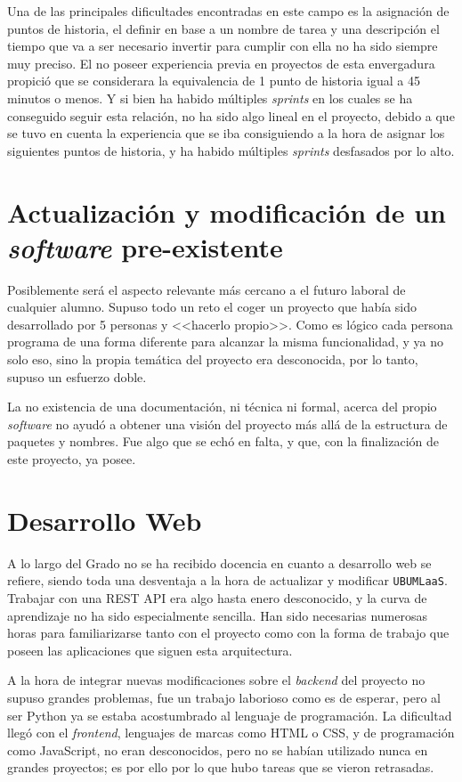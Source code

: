 Una de las principales dificultades encontradas en este campo es la asignación de puntos de historia, el definir en base a un nombre de tarea y una descripción el tiempo que va a ser necesario invertir para cumplir con ella no ha sido siempre muy preciso. El no poseer experiencia previa en proyectos de esta envergadura propició que se considerara la equivalencia de 1 punto de historia igual a 45 minutos o menos. Y si bien ha habido múltiples \textit{sprints} en los cuales se ha conseguido seguir esta relación, no ha sido algo lineal en el proyecto, debido a que se tuvo en cuenta la experiencia que se iba consiguiendo a la hora de asignar los siguientes puntos de historia, y ha habido múltiples \textit{sprints} desfasados por lo alto.

\section{Actualización y modificación de un \textit{software} pre-existente}
Posiblemente será el aspecto relevante más cercano a el futuro laboral de cualquier alumno. Supuso todo un reto el coger un proyecto que había sido desarrollado por 5 personas y <<hacerlo propio>>. Como es lógico cada persona programa de una forma diferente para alcanzar la misma funcionalidad, y ya no solo eso, sino la propia temática del proyecto era desconocida, por lo tanto, supuso un esfuerzo doble.

La no existencia de una documentación, ni técnica ni formal, acerca del propio \textit{software} no ayudó a obtener una visión del proyecto más allá de la estructura de paquetes y nombres. Fue algo que se echó en falta, y que, con la finalización de este proyecto, ya posee.

\section{Desarrollo Web}
A lo largo del Grado no se ha recibido docencia en cuanto a desarrollo web se refiere, siendo toda una desventaja a la hora de actualizar y modificar \texttt{UBUMLaaS}. Trabajar con una REST API era algo hasta enero desconocido, y la curva de aprendizaje no ha sido especialmente sencilla. Han sido necesarias numerosas horas para familiarizarse tanto con el proyecto como con la forma de trabajo que poseen las aplicaciones que siguen esta arquitectura.

A la hora de integrar nuevas modificaciones sobre el \textit{backend} del proyecto no supuso grandes problemas, fue un trabajo laborioso como es de esperar, pero al ser Python ya se estaba acostumbrado al lenguaje de programación. La dificultad llegó con el \textit{frontend}, lenguajes de marcas como HTML o CSS, y de programación como JavaScript, no eran desconocidos, pero no se habían utilizado nunca en grandes proyectos; es por ello por lo que hubo tareas que se vieron retrasadas. 

